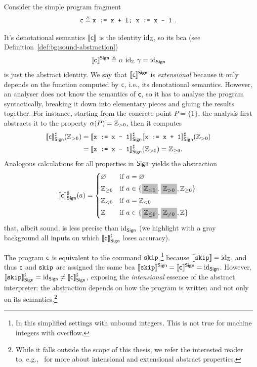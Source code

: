 \begin{example}
	Consider the simple program fragment
	$$\regc \eqdef \code{x := x + 1; x := x - 1}\ .$$

	It's denotational semantics $\llbracket\mathsf{c}\rrbracket$ is the identity $\text{id}_{\mathbb{Z}}$, so its bca (see Definition~\ref{def:bg:sound-abstraction})
	\[
	\llbracket\mathsf{c}\rrbracket^{\mathsf{Sign}} \triangleq \alpha~\text{id}_{\mathbb{Z}}~\gamma = \text{id}_{\mathsf{Sign}}
	\]
	is just the abstract identity. We say that $\llbracket\mathsf{c}\rrbracket^{\mathsf{Sign}}$ is \emph{extensional} because it only depends on the function computed by $\mathsf{c}$, i.e., its denotational semantics. However, an analyser does not know the semantics of $\mathsf{c}$, so it has to analyse the program syntactically, breaking it down into elementary pieces and gluing the results together. For instance, starting from the concrete point $P = \{ 1 \}$, the analysis first abstracts it to the property $\alpha(P) = \mathbb{Z}_{> 0}$, then it computes
	\begin{align*}
		\llbracket\mathsf{c}\rrbracket^{\sharp}_{\mathsf{Sign}} (\mathbb{Z}_{> 0}) & = \llbracket\texttt{x := x - 1}\rrbracket^{\sharp}_{\mathsf{Sign}} \llbracket\texttt{x := x + 1}\rrbracket^{\sharp}_{\mathsf{Sign}} (\mathbb{Z}_{> 0}) \\
		                                             & = \llbracket\texttt{x := x - 1}\rrbracket^{\sharp}_{\mathsf{Sign}} (\mathbb{Z}_{> 0}) = \mathbb{Z}_{\ge 0} .
	\end{align*}
	Analogous calculations for all properties in $\mathsf{Sign}$ yields the abstraction
	\[
	\denot{\regc}^{\sharp}_{\Sign}(a) = \begin{cases*}
		\varnothing   & if $a = \varnothing$                                                                                     \\
		\setZ_{\ge 0} & if $a \in \{ \colorbox{lightgray}{$\setZ_{= 0}$}, \colorbox{lightgray}{$\setZ_{> 0}$}, \setZ_{\ge 0} \}$ \\
		\setZ_{< 0}   & if $a = \setZ_{< 0}$                                                                                     \\
		\setZ         & if $a \in \{ \colorbox{lightgray}{$\setZ_{\le 0}$}, \colorbox{lightgray}{$\setZ_{\neq 0}$}, \setZ \}$
	\end{cases*}
	\]
	that, albeit sound, is less precise than $\text{id}_{\mathsf{Sign}}$ (we highlight with a gray background all inputs on which $\llbracket\mathsf{c}\rrbracket^{\sharp}_{\mathsf{Sign}}$ loses accuracy).

	The program $\mathsf{c}$ is equivalent to the command $\texttt{skip}$,\footnote{In this simplified settings with unbound integers. This is not true for machine integers with overflow.} because $\llbracket\texttt{skip}\rrbracket=\text{id}_{\mathbb{Z}}$, and thus $\mathsf{c}$ and $\texttt{skip}$ are assigned the same bca $\llbracket\texttt{skip}\rrbracket^{\mathsf{Sign}} = \llbracket\mathsf{c}\rrbracket^{\mathsf{Sign}} = \text{id}_{\mathsf{Sign}}$.
	However, $\llbracket\texttt{skip}\rrbracket^{\sharp}_{\mathsf{Sign}} = \text{id}_{\mathsf{Sign}} \neq \llbracket\mathsf{c}\rrbracket^{\sharp}_{\mathsf{Sign}}$, exposing the \emph{intensional} essence of the abstract interpreter: the abstraction depends on how the program is written and not only on its semantics.\footnote{While it falls outside the scope of this thesis, we refer the interested reader to, e.g.,~\cite{BGGGP19,BRZ22} for more about intensional and extensional abstract properties.}
\end{example}

